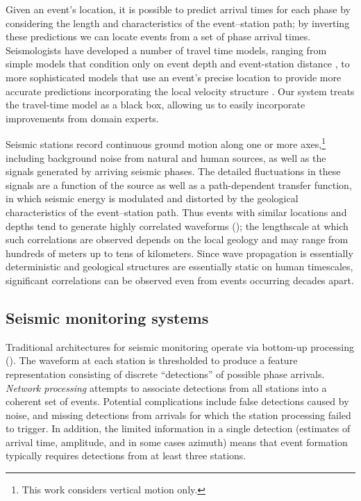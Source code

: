 \documentclass[twoside]{article} \usepackage{aistats2017}
\begin{document}
Given an event's location, it is possible to predict arrival times for
each phase by considering the length and characteristics of the event--station
path; by inverting these predictions we can locate events from
a set of phase arrival times.  Seismologists have developed a number of travel
time models, ranging from simple models that condition only on event
depth and event-station distance \citep{kennett1991traveltimes}, to more sophisticated models
that use an event's precise location to provide more
accurate predictions incorporating the local velocity structure \citep{simmons2012llnl}. Our system
treats the travel-time model as a black box, allowing us to easily incorporate improvements from domain experts. 

Seismic stations record continuous ground motion along one or more
axes,\footnote{This work considers vertical motion only.} including background noise from natural and human sources, as well as the
signals generated by arriving seismic phases. The detailed
fluctuations in these signals are a function of the source  as well as a path-dependent transfer function,
in which seismic energy is modulated and distorted by the geological
characteristics of the event--station path. Thus events with similar
locations and depths tend to generate highly correlated waveforms (); the lengthscale at which such
correlations are observed depends on the local geology and may range
from hundreds of meters up to tens of kilometers. Since wave propagation is
essentially deterministic and geological structures are essentially static
on human timescales, significant correlations can be observed even
from events occurring decades apart. 

\subsection{Seismic monitoring systems}

Traditional architectures for seismic monitoring operate via bottom-up
processing (). The waveform at each station is thresholded to
produce a feature representation consisting of discrete ``detections'' of possible phase
arrivals. {\em
  Network processing} attempts to associate detections from
all stations into a coherent set of events. Potential complications include
false detections caused by noise, and missing detections from
arrivals for which the station processing failed to trigger.
In addition, the limited information in a single detection
(estimates of arrival time, amplitude, and in some cases
azimuth) means that event formation typically requires detections from
at least three stations.
\end{document}
